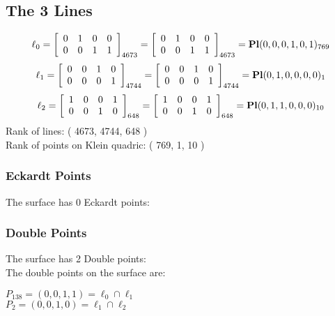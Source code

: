 \documentclass{article}
\begin{document}
{\subsection*{The 3 Lines}
$$
\ell_{0} = 
\left[
\begin{array}{*{4}{r}}
0 & 1 & 0 & 0\\
0 & 0 & 1 & 1\\
\end{array}
\right]
_{4673}
=
\left[
\begin{array}{*{4}c}
0  & 1  & 0  & 0\\
0  & 0  & 1  & 1\\
\end{array}
\right]_{4673}
={\rm\bf Pl}(0,0,0,1,0,1 )_{769}$$
$$
\ell_{1} = 
\left[
\begin{array}{*{4}{r}}
0 & 0 & 1 & 0\\
0 & 0 & 0 & 1\\
\end{array}
\right]
_{4744}
=
\left[
\begin{array}{*{4}c}
0  & 0  & 1  & 0\\
0  & 0  & 0  & 1\\
\end{array}
\right]_{4744}
={\rm\bf Pl}(0,1,0,0,0,0 )_{1}$$
$$
\ell_{2} = 
\left[
\begin{array}{*{4}{r}}
1 & 0 & 0 & 1\\
0 & 0 & 1 & 0\\
\end{array}
\right]
_{648}
=
\left[
\begin{array}{*{4}c}
1  & 0  & 0  & 1\\
0  & 0  & 1  & 0\\
\end{array}
\right]_{648}
={\rm\bf Pl}(0,1,1,0,0,0 )_{10}$$
Rank of lines: ( 4673, 4744, 648 )\\
Rank of points on Klein quadric: ( 769, 1, 10 )\\
\subsubsection*{Eckardt Points}
The surface has 0 Eckardt points:\\
\subsubsection*{Double Points}
The surface has 2 Double points:\\
The double points on the surface are:\\
\begin{multicols}{2}
\noindent
$P_{138} = ( 0, 0, 1, 1 ) = \ell_{0} \cap \ell_{1} $\\
$P_{2} = ( 0, 0, 1, 0 ) = \ell_{1} \cap \ell_{2} $\\
\end{multicols}
}
\end{document}
